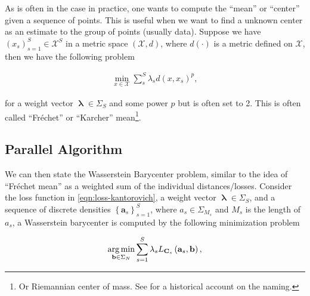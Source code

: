 

As is often in the case in practice, one wants to compute the ``mean'' or ``center'' given a sequence of points.
This is useful when we want to find a unknown center as an estimate to the group of points (usually data).
Suppose we have $\left(x_s\right)_{s = 1}^S \in \mathcal{X}^S$ in a metric space $\left(\mathcal{X}, d\right)$,
where $d(\cdot)$ is a metric defined on $\mathcal{X}$,
then we have the following problem

\begin{equation*}
  \begin{aligned}
    \min_{x \in \mathcal{X}} \sum_s^S \lambda_s d(x, x_s)^p,
  \end{aligned}
\end{equation*}

for a weight vector $\boldsymbol{\uplambda} \in \Sigma_S$ and some power $p$ but is often set to 2.
This is often called ``Fr\'echet'' or ``Karcher'' mean\footnote{
  Or Riemannian center of mass.
  See \citet{karcher2014} for a historical account on the naming.
}.

\subsection{Parallel Algorithm}\label{subsec:barycenter-parallel}

We can then state the Wasserstein Barycenter problem, similar to the idea of ``Fr\'echet mean''
as a weighted sum of the individual distances/losses.
Consider the loss function in \cref{eqn:loss-kantorovich},
a weight vector $\boldsymbol{\uplambda} \in \Sigma_S$,
and a sequence of discrete densities $\left\{\mathbf{a}_s\right\}_{s = 1}^S$,
where $a_s \in \Sigma_{M_s}$ and $M_s$ is the length of $a_s$,
a Wasserstein barycenter is computed by the following minimization problem

\begin{equation*}
  \begin{aligned}
    \operatorname*{arg\,min}_{\mathbf{b} \in \Sigma_N} \sum_{s=1}^S \lambda_s L_{\mathbf{C}_s} \left(\mathbf{a}_s, \mathbf{b}\right),
  \end{aligned}
\end{equation*}

